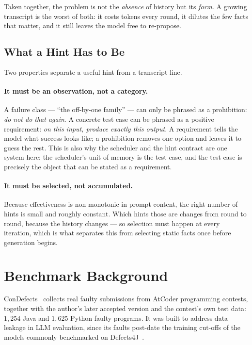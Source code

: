 Taken together, the problem is not the \emph{absence} of history but its
\emph{form}. A growing transcript is the worst of both: it costs tokens every
round, it dilutes the few facts that matter, and it still leaves the model free
to re-propose.

\subsection{What a Hint Has to Be}

Two properties separate a useful hint from a transcript line.

\paragraph{It must be an observation, not a category.} A failure class ---
``the off-by-one family'' --- can only be phrased as a prohibition: \emph{do
not do that again}. A concrete test case can be phrased as a positive
requirement: \emph{on this input, produce exactly this output}. A requirement
tells the model what success looks like; a prohibition removes one option and
leaves it to guess the rest. This is also why the scheduler and the hint
contract are one system here: the scheduler's unit of memory is the test case,
and the test case is precisely the object that can be stated as a requirement.

\paragraph{It must be selected, not accumulated.} Because effectiveness is
non-monotonic in prompt content, the right number of hints is small and
roughly constant. Which hints those are changes from round to round, because
the history changes --- so selection must happen at every iteration, which is
what separates this from selecting static facts once before generation begins.

\section{Benchmark Background}
\label{sec:bg-benchmark}

ConDefects~\citep{wu2024condefects} collects real faulty submissions from
AtCoder programming contests, together with the author's later accepted version
and the contest's own test data: $1{,}254$ Java and $1{,}625$ Python faulty
programs. It was built to address data leakage in LLM evaluation, since its
faults post-date the training cut-offs of the models commonly benchmarked on
Defects4J~\citep{just2014defects4j}.

